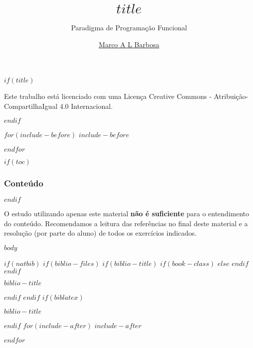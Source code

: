 \documentclass[$if(fontsize)$$fontsize$,$endif$$if(handout)$handout,$endif$$if(beamer)$ignorenonframetext,$endif$$for(classoption)$$classoption$$sep$,$endfor$]{$documentclass$}
\title{$title$}
\subtitle{Paradigma de Programação Funcional}
\author{\href{malbarbo.pro.br}{Marco A L Barbosa}}
\date{}
\begin{document}
$if(title)$
\begin{frame}[plain]
  \vspace{1.5cm}
  \titlepage
  \begin{center} 
    \href{http://creativecommons.org/licenses/by-sa/4.0/}{\ccbysa}

    {\tiny
      Este trabalho está licenciado com uma Licença Creative Commons -
      Atribuição-CompartilhaIgual 4.0 Internacional.
    }
  \end{center}
\end{frame}
$endif$

$for(include-before)$
$include-before$

$endfor$

$if(toc)$
\begin{frame}[plain]
  \frametitle{Conteúdo}
  \tableofcontents
\end{frame}
$endif$

\begin{frame}

  O estudo utilizando apenas este material \textbf{não é suficiente} para o
  entendimento do conteúdo. Recomendamos a leitura das referências no final
  deste material e a resolução (por parte do aluno) de todos os exercícios
  indicados.

\end{frame}

$body$

$if(natbib)$
$if(biblio-files)$
$if(biblio-title)$
$if(book-class)$
\renewcommand\bibname{$biblio-title$}
$else$
\renewcommand\refname{$biblio-title$}
$endif$
$endif$
\begin{frame}[allowframebreaks]{$biblio-title$}

\end{frame}

$endif$
$endif$
$if(biblatex)$
\begin{frame}[allowframebreaks]{$biblio-title$}
\printbibliography[heading=none]
\end{frame}

$endif$
$for(include-after)$
$include-after$

$endfor$
\end{document}
